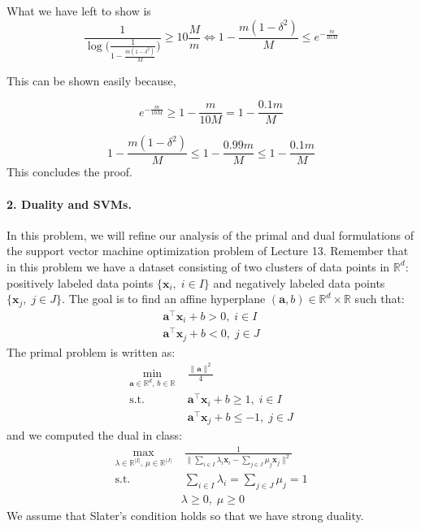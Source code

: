 \documentclass[11pt]{article}
\theoremstyle{remark}
\newcommand{\R}{\mathbb{R}}                     %
\newcommand{\bx}{\mathbf{x}}
\newcommand{\ba}{\mathbf{a}}
\begin{document}
What we have left to show is 
$$\frac{1}{\log\Big(\frac{1}{1-\frac{m(1-\delta^2)}{M}}\Big)} \geq 10 \frac{M}{m} \Leftrightarrow 1-\frac{m(1-\delta^2)}{M} \leq e^{-\frac{m}{10M}}$$

This can be shown easily because,

$$e^{-\frac{m}{10M}} \geq 1-\frac{m}{10M} = 1-\frac{0.1m}{M}$$

$$1-\frac{m(1-\delta^2)}{M} \leq 1-\frac{0.99m}{M} \leq 1-\frac{0.1m}{M}$$
This concludes the proof.
\color{black}


\paragraph{2. Duality and SVMs.}

In this problem, we will refine our analysis of the primal and dual
formulations of the support vector machine optimization problem of Lecture 13.
Remember that in this problem we have a dataset consisting of two clusters of
data points in $\R^d$: positively labeled data points $\{\bx_i,\; i\in I\}$ and
negatively labeled data points $\{\bx_j,\; j\in J\}$. The goal is to find
an affine hyperplane $(\ba, b)\in \R^d\times\R$ such that:
\begin{gather*}
    \ba^\intercal \bx_i  + b > 0,\; i\in I\\
    \ba^\intercal \bx_j  + b < 0,\; j\in J
\end{gather*}
The primal problem is written as:
    \begin{align*}%
        \min_{\ba\in\R^d,\, b\in\R}&\;\frac{\|\ba\|^2}{4}\\
        \text{s.t.}&\; \ba^\intercal\bx_i + b \geq 1,\; i\in I\\
                   &\; \ba^\intercal \bx_j + b \leq -1,\; j\in J
    \end{align*}
and we computed the dual in class:
    \begin{align*}%
        \max_{\lambda\in\R^{|I|},\, \mu\in\R^{|J|}}&\;\frac{1}{\big\|\sum_{i\in I}\lambda_i \bx_i
    - \sum_{j\in J}\mu_j \bx_j\big\|^2}\\
    \text{s.t.}&\;\sum_{i\in I}\lambda_i = \sum_{j\in J}\mu_j = 1\\
               &\lambda\geq 0,\;\mu\geq 0
    \end{align*}
We assume that Slater's condition holds so that we have strong duality.
\end{document}
